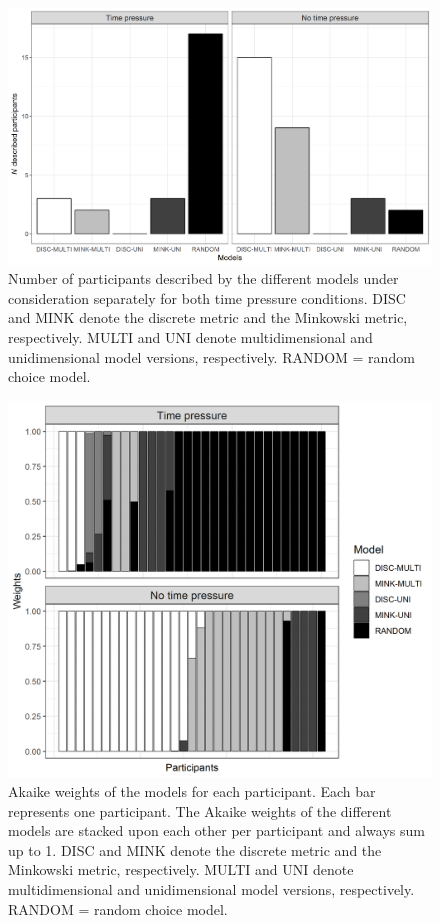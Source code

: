 \documentclass[a4paper,man,natbib]{apa6}
\begin{document}
\begin{figure}
\centering
\includegraphics[width = \textwidth]{fig_model_selection.png}
\caption{Number of participants described by the different models under consideration separately for both time pressure conditions. DISC and MINK denote the discrete metric and the Minkowski metric, respectively. MULTI and UNI denote multidimensional and unidimensional model versions, respectively. RANDOM = random choice model.}
\label{fig:model_selection}
\end{figure}

\begin{figure}
\centering
\includegraphics[width = \textwidth]{fig_aic.png}
\caption{Akaike weights of the models for each participant. Each bar represents one participant. The Akaike weights of the different models are stacked upon each other per participant and always sum up to 1. DISC and MINK denote the discrete metric and the Minkowski metric, respectively. MULTI and UNI denote multidimensional and unidimensional model versions, respectively. RANDOM = random choice model.}
\label{fig:aic}
\end{figure}
\end{document}
